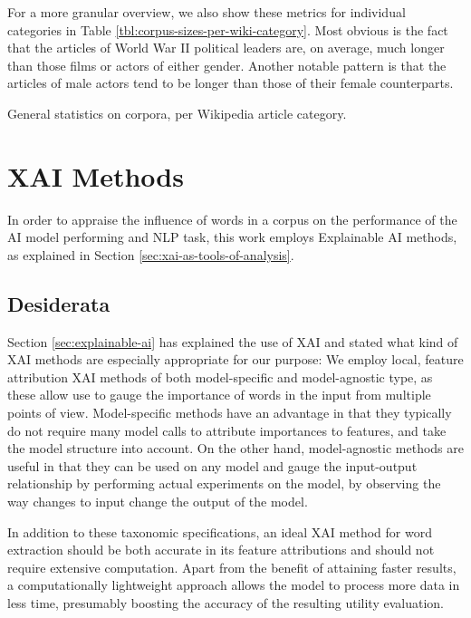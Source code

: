 For a more granular overview, we also show these metrics for individual categories in Table \ref{tbl:corpus-sizes-per-wiki-category}.
Most obvious is the fact that the articles of World War II political leaders are, on average, much longer than those films or actors of either gender.
Another notable pattern is that the articles of male actors tend to be longer than those of their female counterparts.


\begin{table}[ht]
	\centering
	
	\caption{General statistics on corpora, per Wikipedia article category.}
	\label{tbl:corpus-sizes-per-wiki-category}
\end{table}

\section{XAI Methods} \label{sec:xai-methods}
In order to appraise the influence of words in a corpus on the performance of the AI model performing and NLP task, this work employs Explainable AI methods, as explained in Section \ref{sec:xai-as-tools-of-analysis}.

\subsection{Desiderata}
Section \ref{sec:explainable-ai} has explained the use of XAI and stated what kind of XAI methods are especially appropriate for our purpose:
We employ local, feature attribution XAI methods of both model-specific and model-agnostic type, as these allow use to gauge the importance of words in the input from multiple points of view.
Model-specific methods have an advantage in that they typically do not require many model calls to attribute importances to features, and take the model structure into account.
On the other hand, model-agnostic methods are useful in that they can be used on any model and gauge the input-output relationship by performing actual experiments on the model, by observing the way changes to input change the output of the model.

In addition to these taxonomic specifications, an ideal XAI method for word extraction should be both accurate in its feature attributions and should not require extensive computation.
Apart from the benefit of attaining faster results, a computationally lightweight approach allows the model to process more data in less time, presumably boosting the accuracy of the resulting utility evaluation.


